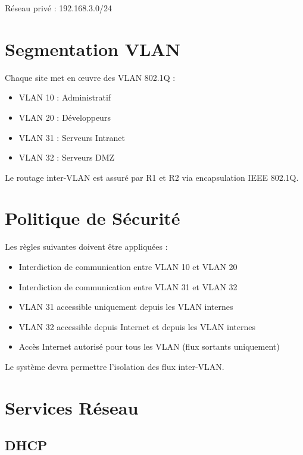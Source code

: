 \documentclass[11pt,a4paper]{memoir}%
\begin{document}
		Réseau privé :  192.168.3.0/24
	
	\section{Segmentation VLAN}
	
	Chaque site met en œuvre des VLAN 802.1Q :
	
	\begin{itemize}
		\item VLAN 10 : Administratif
		\item VLAN 20 : Développeurs
		\item VLAN 31 : Serveurs Intranet
		\item VLAN 32 : Serveurs DMZ
	\end{itemize}
	
	Le routage inter-VLAN est assuré par R1 et R2 via encapsulation IEEE 802.1Q.
	
	\section{Politique de Sécurité}
	
	Les règles suivantes doivent être appliquées :
	
	\begin{itemize}
		\item Interdiction de communication entre VLAN 10 et VLAN 20
		\item Interdiction de communication entre VLAN 31 et VLAN 32
		\item VLAN 31 accessible uniquement depuis les VLAN internes
		\item VLAN 32 accessible depuis Internet et depuis les VLAN internes
		\item Accès Internet autorisé pour tous les VLAN (flux sortants uniquement)		
	\end{itemize}
	
	Le système devra permettre l’isolation des flux inter-VLAN.
	
	\section{Services Réseau}
	
	\subsection{DHCP}
	
\end{document}
